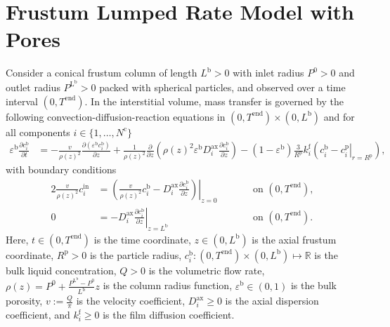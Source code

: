 \documentclass{article}
\begin{document}
\section*{Frustum Lumped Rate Model with Pores}
Consider a conical frustum column of length $L^{\mathrm{b}} > 0$ with inlet radius $P^{\mathrm{0}} > 0$ and outlet radius $P^{\mathrm{L^{\mathrm{b}}}} > 0$ packed with spherical particles, and observed over a time interval $(0, T^{\mathrm{end}})$.
In the interstitial volume, mass transfer is governed by the following convection-diffusion-reaction equations in $(0, T^{\mathrm{end}})\times (0, L^{\mathrm{b}})$ and for all components $i\in\{1, \dots, N^{\mathrm{c}} \}$
\begin{align}
    \varepsilon^{\mathrm{b}} \frac{\partial c^{\mathrm{b}}_{i}}{\partial t}
    &= - \frac{v}{\rho(z)^{2}} \frac{\partial \left( \varepsilon^{\mathrm{b}} c^{\mathrm{b}}_{i} \right)}{\partial z}
        + \frac{1}{\rho(z)^{2}} \frac{\partial}{\partial z} \left( \rho(z)^{2} \varepsilon^{\mathrm{b}} D^{\mathrm{ax}}_{i} \frac{\partial c^{\mathrm{b}}_{i}}{\partial z} \right)
        - \left(1 - \varepsilon^{\mathrm{b}} \right) \frac{3}{R^{\mathrm{p}}} k^{\mathrm{f}}_{i} \left(c^{\mathrm{b}}_{i} - \left. c^{\mathrm{p}}_{i} \right|_{r = R^{\mathrm{p}}} \right),
\end{align}
with boundary conditions
\begin{alignat}{2}
    \frac{v}{\rho(z)^{2}} c^{\mathrm{in}}_{i}
    &= \left.\left( \frac{v}{\rho(z)^{2}} c^{\mathrm{b}}_{i} - D^{\mathrm{ax}}_{i} \frac{\partial c^{\mathrm{b}}_{i}}{\partial z}\right)\right|_{z=0}
    & & \qquad\text{on }(0, T^{\mathrm{end}}),
    \\
    0
    &= - D^{\mathrm{ax}}_{i} \left. \frac{\partial c^{\mathrm{b}}_{i}}{\partial z} \right|_{z=L^{\mathrm{b}}}
    & & \qquad\text{on }(0, T^{\mathrm{end}}).
\end{alignat}
Here, $t\in (0, T^{\mathrm{end}})$ is the time coordinate, $z\in (0, L^{\mathrm{b}})$ is the axial frustum coordinate, $R^{\mathrm{p}}> 0$ is the particle radius, $c^{\mathrm{b}}_{i}\colon (0, T^{\mathrm{end}})\times (0, L^{\mathrm{b}}) \mapsto \mathbb{R}$ is the bulk liquid concentration, $Q> 0$ is the volumetric flow rate, $\rho(z) = P^{\mathrm{0}} + \frac{P^{\mathrm{L^{\mathrm{b}}}} - P^{\mathrm{0}}}{L^{\mathrm{b}}} z$ is the column radius function, $\varepsilon^{\mathrm{b}}\in (0, 1)$ is the bulk porosity, $v:= \frac{Q}{\pi}$ is the velocity coefficient, $D^{\mathrm{ax}}_{i}\geq 0$ is the axial dispersion coefficient, and $k^{\mathrm{f}}_{i}\geq 0$ is the film diffusion coefficient.
\end{document}
